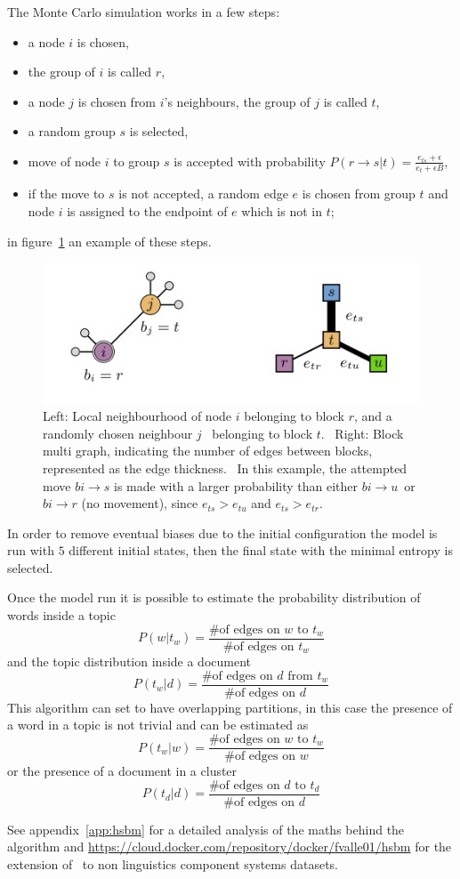 The Monte Carlo simulation works in a few steps:
\begin{itemize}
 \item a node $i$ is chosen,
 \item the group of $i$ is called $r$,
  \item a node $j$ is chosen from $i$'s neighbours, the group of $j$ is called $t$,
  \item a random group $s$ is selected,
  \item move of node $i$ to group $s$ is accepted with probability $P(r\to s|t)=\frac{e_{ts}+\epsilon}{e_t+\epsilon B}$,
  \item if the move to $s$ is not accepted, a random edge $e$ is chosen from group $t$ and node $i$ is assigned to the endpoint of $e$ which is not in $t$;
\end{itemize}
in figure~\ref{fig:topic_peixioto_move} an example of these steps.
\begin{figure}[htb!]
  \centering
  \includegraphics[width=0.9\linewidth]{pictures/topic/peixioto_move.jpg}
  \caption{Left: Local neighbourhood of node $i$ belonging to block $r$, and a randomly chosen neighbour $j$ \
  belonging to block $t$. \
  Right: Block multi graph, indicating the number of edges between blocks, represented as the edge thickness. \
  In this example, the attempted move $bi \to s$ is made with a larger probability than either $bi \to u$\
   or $bi \to r$ (no movement), since $e_{ts}>e_{tu}$ and $e_{ts}>e_{tr}$.}
  \label{fig:topic_peixioto_move}
\end{figure}

In order to remove eventual biases due to the initial configuration the model is run with $5$ different initial states, then the final state with the minimal entropy is selected.

Once the model run it is possible to estimate the probability distribution of words inside a topic
\[P(w|t_w)=\frac{\text{\# of edges on $w$ to $t_w$}}{\text{\# of edges on $t_w$}}\]
and the topic distribution inside a document
\[P(t_w|d)=\frac{\text{\# of edges on $d$ from $t_w$}}{\text{\# of edges on $d$}}\]
This algorithm can set to have overlapping partitions, in this case the presence of a word in a topic is not trivial and can be estimated as
\[P(t_w|w)=\frac{\text{\# of edges on $w$ to $t_w$}}{\text{\# of edges on $w$}}\]
or the presence of a document in a cluster
\[P(t_d|d)=\frac{\text{\# of edges on $d$ to $t_d$}}{\text{\# of edges on $d$}}\]

See appendix~\ref{app:hsbm} for a detailed analysis of the maths behind the algorithm and \url{https://cloud.docker.com/repository/docker/fvalle01/hsbm} for the extension of~\cite{gerlach2018network} to non linguistics component systems datasets.
